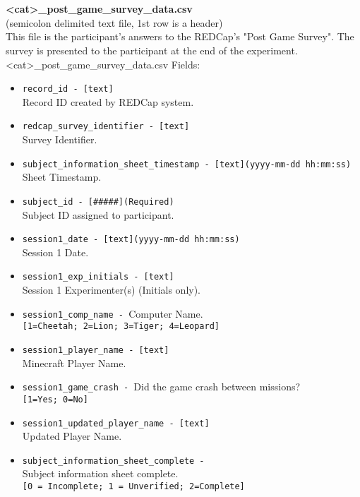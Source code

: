 \begin{description}
\begin{addmargin}[0em]{0em}
    \textbf{\\\\}
    \begin{addmargin}[1em]{0em} %
        \textbf{<cat>\_post\_game\_survey\_data.csv}\\(semicolon delimited text file, 1st row is a header)\\
        This file is the participant's answers to the REDCap's "Post Game Survey".
        The survey is presented to the participant at the end of the experiment.\\ 
        <cat>\_post\_game\_survey\_data.csv Fields:
        \begin{itemize}
            \item \verb|record_id - [text]|\\Record ID created by REDCap system.
            \item \verb|redcap_survey_identifier - [text]|\\Survey Identifier.
            \item \verb|subject_information_sheet_timestamp - [text](yyyy-mm-dd hh:mm:ss)|\\Sheet Timestamp.
            \item \verb|subject_id - [#####](Required)|\\Subject ID assigned to participant.
            \item \verb|session1_date - [text](yyyy-mm-dd hh:mm:ss)|\\Session 1 Date.
            \item \verb|session1_exp_initials - [text]|\\Session 1 Experimenter(s) (Initials only).
            \item \verb|session1_comp_name - |Computer Name.\\\verb|[1=Cheetah; 2=Lion; 3=Tiger; 4=Leopard]|
            \item \verb|session1_player_name - [text]|\\Minecraft Player Name.
            \item \verb|session1_game_crash - |Did the game crash between missions?\\\verb|[1=Yes; 0=No]|
            \item \verb|session1_updated_player_name - [text]|\\Updated Player Name.
            \item \verb|subject_information_sheet_complete - |\\Subject information sheet complete.\\\verb|[0 = Incomplete; 1 = Unverified; 2=Complete]|

\end{itemize}
\end{addmargin}
\end{addmargin}
\end{description}
